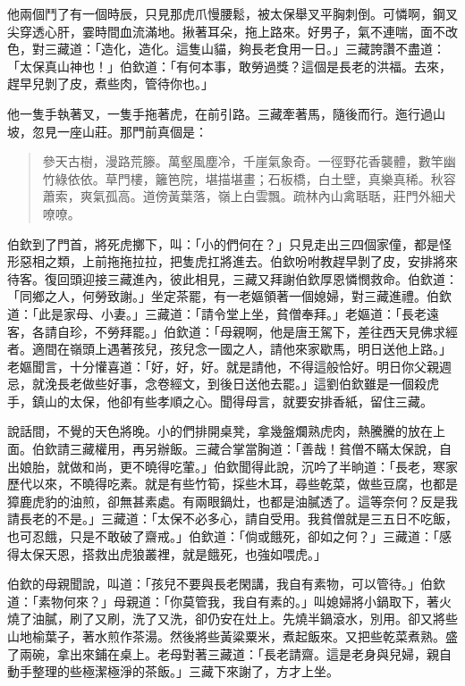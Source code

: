 他兩個鬥了有一個時辰，只見那虎爪慢腰鬆，被太保舉叉平胸刺倒。可憐啊，鋼叉尖穿透心肝，霎時間血流滿地。揪著耳朵，拖上路來。好男子，氣不連喘，面不改色，對三藏道：「造化，造化。這隻山貓，夠長老食用一日。」三藏誇讚不盡道：「太保真山神也！」伯欽道：「有何本事，敢勞過獎？這個是長老的洪福。去來，趕早兒剝了皮，煮些肉，管待你也。」

他一隻手執著叉，一隻手拖著虎，在前引路。三藏牽著馬，隨後而行。迤行過山坡，忽見一座山莊。那門前真個是：
\begin{quote}
參天古樹，漫路荒籐。萬壑風塵冷，千崖氣象奇。一徑野花香襲體，數竿幽竹綠依依。草門樓，籬笆院，堪描堪畫；石板橋，白土壁，真樂真稀。秋容蕭索，爽氣孤高。道傍黃葉落，嶺上白雲飄。疏林內山禽聒聒，莊門外細犬嘹嘹。
\end{quote}

伯欽到了門首，將死虎擲下，叫：「小的們何在？」只見走出三四個家僮，都是怪形惡相之類，上前拖拖拉拉，把隻虎扛將進去。伯欽吩咐教趕早剝了皮，安排將來待客。復回頭迎接三藏進內，彼此相見，三藏又拜謝伯欽厚恩憐憫救命。伯欽道：「同鄉之人，何勞致謝。」坐定茶罷，有一老嫗領著一個媳婦，對三藏進禮。伯欽道：「此是家母、小妻。」三藏道：「請令堂上坐，貧僧奉拜。」老嫗道：「長老遠客，各請自珍，不勞拜罷。」伯欽道：「母親啊，他是唐王駕下，差往西天見佛求經者。適間在嶺頭上遇著孩兒，孩兒念一國之人，請他來家歇馬，明日送他上路。」老嫗聞言，十分懽喜道：「好，好，好。就是請他，不得這般恰好。明日你父親週忌，就浼長老做些好事，念卷經文，到後日送他去罷。」這劉伯欽雖是一個殺虎手，鎮山的太保，他卻有些孝順之心。聞得母言，就要安排香紙，留住三藏。

說話間，不覺的天色將晚。小的們排開桌凳，拿幾盤爛熟虎肉，熱騰騰的放在上面。伯欽請三藏權用，再另辦飯。三藏合掌當胸道：「善哉！貧僧不瞞太保說，自出娘胎，就做和尚，更不曉得吃葷。」伯欽聞得此說，沉吟了半晌道：「長老，寒家歷代以來，不曉得吃素。就是有些竹筍，採些木耳，尋些乾菜，做些豆腐，也都是獐鹿虎豹的油煎，卻無甚素處。有兩眼鍋灶，也都是油膩透了。這等奈何？反是我請長老的不是。」三藏道：「太保不必多心，請自受用。我貧僧就是三五日不吃飯，也可忍餓，只是不敢破了齋戒。」伯欽道：「倘或餓死，卻如之何？」三藏道：「感得太保天恩，搭救出虎狼叢裡，就是餓死，也強如喂虎。」

伯欽的母親聞說，叫道：「孩兒不要與長老閑講，我自有素物，可以管待。」伯欽道：「素物何來？」母親道：「你莫管我，我自有素的。」叫媳婦將小鍋取下，著火燒了油膩，刷了又刷，洗了又洗，卻仍安在灶上。先燒半鍋滾水，別用。卻又將些山地榆葉子，著水煎作茶湯。然後將些黃粱粟米，煮起飯來。又把些乾菜煮熟。盛了兩碗，拿出來鋪在桌上。老母對著三藏道：「長老請齋。這是老身與兒婦，親自動手整理的些極潔極淨的茶飯。」三藏下來謝了，方才上坐。

